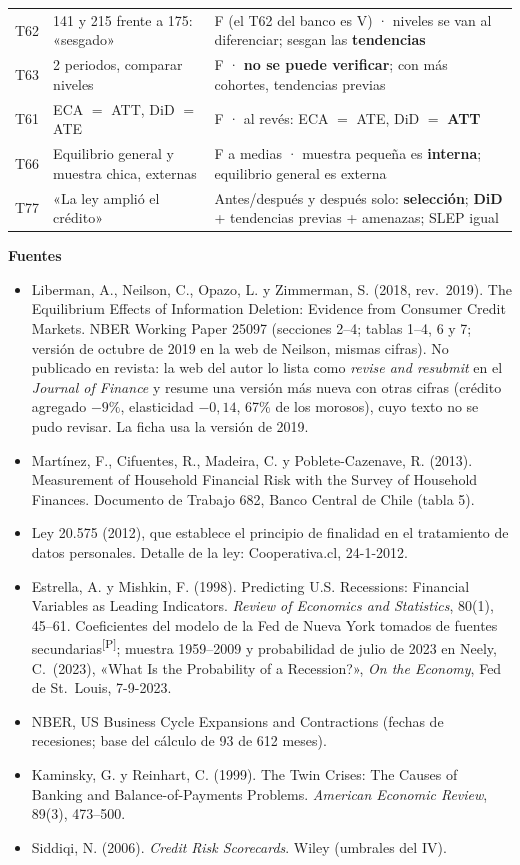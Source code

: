 \documentclass[10pt,a4paper]{article}
\newcommand{\Pre}{\textsuperscript{\textcolor{orange!80!black}{[P]}}}
\begin{document}
\begin{tabular}{@{}p{1.1cm}p{6.6cm}p{8.7cm}@{}}
T62 & 141 y 215 frente a 175: «sesgado» & F (el T62 del banco es V) · niveles se van al diferenciar; sesgan las \textbf{tendencias}\\
T63 & 2 periodos, comparar niveles & F · \textbf{no se puede verificar}; con más cohortes, tendencias previas\\
T61 & ECA $=$ ATT, DiD $=$ ATE & F · al revés: ECA $=$ ATE, DiD $=$ \textbf{ATT}\\
T66 & Equilibrio general y muestra chica, externas & F a medias · muestra pequeña es \textbf{interna}; equilibrio general es externa\\
T77 & «La ley amplió el crédito» & Antes/después y después solo: \textbf{selección}; \textbf{DiD} + tendencias previas + amenazas; SLEP igual\\\bottomrule
\end{tabular}

\normalsize
\vspace{8pt}
\textbf{Fuentes}
\footnotesize\sloppy
\begin{itemize}[leftmargin=*,itemsep=0pt,topsep=0pt]
\item Liberman, A., Neilson, C., Opazo, L. y Zimmerman, S. (2018, rev.\ 2019). The Equilibrium Effects of Information Deletion: Evidence from Consumer Credit Markets. NBER Working Paper 25097 (secciones 2--4; tablas 1--4, 6 y 7; versión de octubre de 2019 en la web de Neilson, mismas cifras). No publicado en revista: la web del autor lo lista como \emph{revise and resubmit} en el \emph{Journal of Finance} y resume una versión más nueva con otras cifras (crédito agregado $-9\%$, elasticidad $-0{,}14$, 67\% de los morosos), cuyo texto no se pudo revisar. La ficha usa la versión de 2019.
\item Martínez, F., Cifuentes, R., Madeira, C. y Poblete-Cazenave, R. (2013). Measurement of Household Financial Risk with the Survey of Household Finances. Documento de Trabajo 682, Banco Central de Chile (tabla 5).
\item Ley 20.575 (2012), que establece el principio de finalidad en el tratamiento de datos personales. Detalle de la ley: Cooperativa.cl, 24-1-2012.
\item Estrella, A. y Mishkin, F. (1998). Predicting U.S. Recessions: Financial Variables as Leading Indicators. \emph{Review of Economics and Statistics}, 80(1), 45--61. Coeficientes del modelo de la Fed de Nueva York tomados de fuentes secundarias\Pre; muestra 1959--2009 y probabilidad de julio de 2023 en Neely, C.\ (2023), «What Is the Probability of a Recession?», \emph{On the Economy}, Fed de St.\ Louis, 7-9-2023.
\item NBER, US Business Cycle Expansions and Contractions (fechas de recesiones; base del cálculo de 93 de 612 meses).
\item Kaminsky, G. y Reinhart, C. (1999). The Twin Crises: The Causes of Banking and Balance-of-Payments Problems. \emph{American Economic Review}, 89(3), 473--500.
\item Siddiqi, N. (2006). \emph{Credit Risk Scorecards}. Wiley (umbrales del IV).
\end{itemize}
\end{document}
